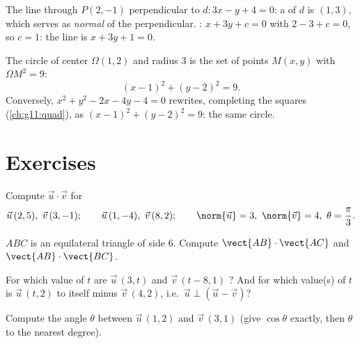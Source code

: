 \begin{example}\label{ex:g11:scal:perpline}
The line through $P(2, -1)$ perpendicular to $d : 3x - y + 4 = 0$: a
 of $d$ is $(1, 3)$, which serves as \emph{normal} 
of the perpendicular. : $x + 3y + c = 0$ with
$2 - 3 + c = 0$, so $c = 1$: the line is $x + 3y + 1 = 0$.
\end{example}

\begin{example}\label{ex:g11:scal:circle}
The circle of center $\Omega(1, 2)$ and radius $3$ is the set of points
$M(x,y)$ with $\Omega M^2 = 9$:
\[
(x - 1)^2 + (y - 2)^2 = 9 .
\]
Conversely, $x^2 + y^2 - 2x - 4y - 4 = 0$ rewrites, completing the
squares (\cref{ch:g11:quad}), as $(x-1)^2 + (y-2)^2 = 9$: the same
circle.
\end{example}

\section{Exercises}

\begin{exercise}[$\star$]\label{exo:g11:scal:1}
Compute $\vec u \cdot \vec v$ for
\[
\vec u\,(2, 5),\ \vec v\,(3, -1); \qquad
\vec u\,(1, -4),\ \vec v\,(8, 2); \qquad
\norm{\vec u} = 3,\ \norm{\vec v} = 4,\ \theta = \frac{\pi}{3} .
\]
\end{exercise}

\begin{exercise}[$\star$]\label{exo:g11:scal:2}
$ABC$ is an equilateral triangle of side $6$. Compute
$\vect{AB} \cdot \vect{AC}$ and $\vect{AB} \cdot \vect{BC}$.
\end{exercise}

\begin{exercise}[$\star$]\label{exo:g11:scal:3}
For which value of $t$ are $\vec u\,(3, t)$ and $\vec v\,(t - 8, 1)$
? And for which value(s) of $t$ is $\vec u\,(t, 2)$ 
to itself minus $\vec v\,(4, 2)$, i.e.\ $\vec u \perp (\vec u - \vec v)$?
\end{exercise}

\begin{exercise}[$\star$]\label{exo:g11:scal:4}
Compute the angle $\theta$ between $\vec u\,(1, 2)$ and $\vec v\,(3, 1)$
(give $\cos\theta$ exactly, then $\theta$ to the nearest degree).
\end{exercise}

